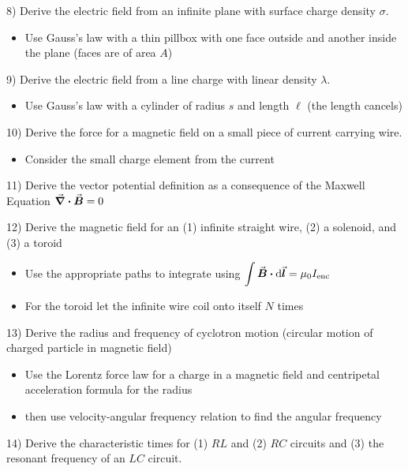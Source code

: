 \documentclass{article}
\begin{document}
\newpage

8) Derive the electric field from an infinite plane with surface charge density $\sigma$.
\begin{itemize}
    \item Use Gauss's law with a thin pillbox with one face outside and another inside the plane (faces are of area $A$) 
\end{itemize}

\newpage

9) Derive the electric field from a line charge with linear density $\lambda$.
\begin{itemize}
    \item Use Gauss's law with a cylinder of radius $s$ and length $\ell$ (the length cancels)
\end{itemize}

\newpage

10) Derive the force for a magnetic field on a small piece of current carrying wire.
\begin{itemize}
    \item Consider the small charge element from the current 
\end{itemize}

\newpage

11) Derive the vector potential definition as a consequence of the Maxwell Equation $\grad \vdot \va*{B} = 0$

\newpage

12) Derive the magnetic field for an (1) infinite straight wire, (2) a solenoid, and (3) a toroid
\begin{itemize}
    \item Use the appropriate paths to integrate using $\displaystyle \int \va*{B} \vdot \dd{\va*{l}} = \mu_0 I_{\rm enc}$ 
    \item For the toroid let the infinite wire coil onto itself $N$ times 
\end{itemize}

\newpage

13) Derive the radius and frequency of cyclotron motion (circular motion of charged particle in magnetic field)
\begin{itemize}
    \item Use the Lorentz force law for a charge in a magnetic field and centripetal acceleration formula for the radius
    \item then use velocity-angular frequency relation to find the angular frequency
\end{itemize}

\newpage

14) Derive the characteristic times for (1) $RL$ and (2) $RC$ circuits and (3) the resonant frequency of an $LC$ circuit.
\end{document}
